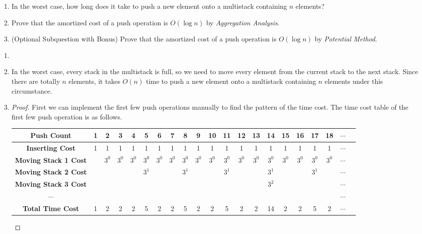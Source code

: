 \documentclass[12pt,a4paper]{article}
\makeatletter
\newtheorem*{solution}{Solution}
\theoremstyle{definition}
\renewenvironment{solution}[1][Solution] {\par\pushQED{\qed}\normalfont\topsep6\p@\@plus6\p@\relax\trivlist\item[\hskip\labelsep\bfseries#1\@addpunct{.}]\ignorespaces}{\popQED\endtrivlist\@endpefalse} \makeatother
\makeatother
\begin{document}
\begin{enumerate}
    \begin{enumerate}
        \item In the worst case, how long does it take to push a new element onto a multistack containing $n$ elements?
        \item Prove that the amortized cost of a push operation is $O(\log n)$ by \emph{Aggregation Analysis}.
        \item {\color{red}(Optional Subquestion with Bonus)} Prove that the amortized cost of a push operation is $O(\log n)$ by \emph{Potential Method}.
    \end{enumerate}
    \begin{enumerate}
    \item
    \begin{solution}
    In the worst case, every stack in the multistack is full, so we need to move every element from the current stack to the next stack. Since there are totally $n$ elements, it takes $O(n)$ time to push a new element onto a multistack containing $n$ elements under this circumstance.
    \end{solution}

    \item
    \begin{proof} First we can implement the first few push operations manually to find the pattern of the time cost. The time cost table of the first few push operation is as follows.

    \begin{table}[htbp]
     	\footnotesize
     	\centering
     	\label{reduction}
     	\renewcommand\arraystretch{1.1}
     	\begin{tabular}{ccccccccccccccccccccc}
     		\hline
            \textbf{Push Count} & 1 & 2 & 3 & 4 & 5 & 6 & 7 & 8 & 9 & 10 & 11 & 12 & 13 & 14 & 15 & 16 & 17 & 18 & $\cdots$ \\ \hline
            \textbf{Inserting Cost} & 1 & 1 & 1 & 1 & 1 & 1 & 1 & 1 & 1 & 1 & 1 & 1 & 1 & 1 & 1 & 1 & 1 & 1 & $\cdots$ \\
            \textbf{Moving Stack 1 Cost} & & $3^0$ & $3^0$ & $3^0$ & $3^0$ & $3^0$ & $3^0$ & $3^0$ & $3^0$ & $3^0$ & $3^0$ & $3^0$ & $3^0$ & $3^0$ & $3^0$ & $3^0$ & $3^0$ & $3^0$ & $\cdots$ \\
            \textbf{Moving Stack 2 Cost} & & & & & $3^1$ & & & $3^1$ & & & $3^1$ & & & $3^1$ & & & $3^1$ & & $\cdots$ \\
            \textbf{Moving Stack 3 Cost} & & & & & & & & & & & & & & $3^2$ & & & & & $\cdots$ \\
            \textbf{$\cdots$} & & & & & & & & & & & & & & & & & & & $\cdots$ \\ \hline
            \textbf{Total Time Cost} & 1 & 2 & 2 & 2 & 5 & 2 & 2 & 5 & 2 & 2 & 5 & 2 & 2 & 14 & 2 & 2 & 5 & 2 & $\cdots$ \\
            \hline
     	\end{tabular}
        \end{table}


\end{proof}
\end{enumerate}
\end{enumerate}
\end{document}
